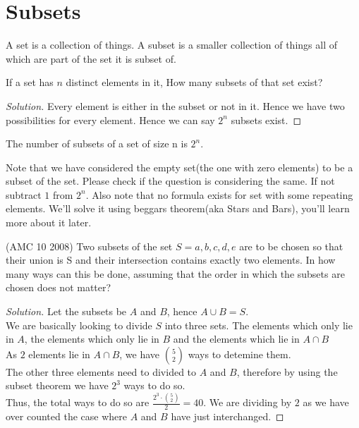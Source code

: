 \section{Subsets}
A set is a collection of things. A subset is a smaller collection of things all of which are part of the set it is subset of.  \\
\begin{example}
    If a set has $n$ distinct elements in it, How many subsets of that set exist?
\end{example}
\begin{proof}
    [Solution]
    Every element is either in the subset or not in it. Hence we have two possibilities for every element. Hence we can say $2^n$ subsets exist.
\end{proof}
\begin{theorem}
    The number of subsets of a set of size n is $2^n$.
\end{theorem}
Note that we have considered the empty set(the one with zero elements) to be a subset of the set. Please check if the question is considering the same. If not subtract $1$ from $2^n$.
Also note that no formula exists for set with some repeating elements. We'll solve it using beggars theorem(aka Stars and Bars),  you'll learn more about it later.
\begin{example}
    (AMC 10 2008) Two subsets of the set $S = {a, b, c, d, e}$ are to be chosen so that their union is S and their intersection contains exactly two elements. In how many ways can this be done, assuming that the order in which the subsets are chosen does not matter?
\end{example}
\begin{proof}
    [Solution]
    Let the subsets be $A$ and $B$, hence $A \cup B = S$.\\
    We are basically looking to divide $S$ into three sets. The elements which only lie in $A$, the elements which only lie in $B$ and the elements which lie in $A \cap B$\\
    As $2$ elements lie in $A \cap B$, we have $\binom{5}{2}$ ways to detemine them.\\
    The other three elements need to divided to $A$ and $B$, therefore by using the subset theorem we have $2^3$ ways to do so.\\
    Thus, the total ways to do so are $\frac{2^3 \cdot \binom{5}{2}}{2}=40$. We are dividing by $2$ as we have over counted the case where $A$ and $B$ have just interchanged.
\end{proof}
